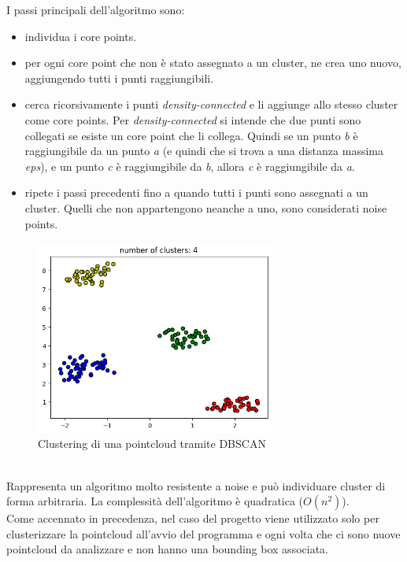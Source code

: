 \documentclass[italian]{report}
\begin{document}
I passi principali dell'algoritmo sono:
\begin{itemize}
	\item individua i core points.
	\item per ogni core point che non è stato assegnato a un cluster, ne crea uno nuovo, aggiungendo tutti i punti raggiungibili.
	\item cerca ricorsivamente i punti \textit{density-connected} e li aggiunge allo stesso cluster come core points. Per \textit{density-connected} si intende che due punti sono collegati se esiste un core point che li collega.		Quindi se un punto \textit{b} è raggiungibile da un punto \textit{a} (e quindi che si trova a una distanza massima \textit{eps}), e un punto \textit{c} è raggiungibile da \textit{b}, allora \textit{c} è raggiungibile da \textit{a}.
	\item ripete i passi precedenti fino a quando tutti i punti sono assegnati a un cluster. Quelli che non appartengono neanche a uno, sono considerati noise points.
\end{itemize}
\begin{figure}[H]
	\centering
	\includegraphics[width=0.7\textwidth]{dbscan}
	\footnotesize
	\caption{Clustering di una pointcloud tramite DBSCAN}	
\end{figure}\\
Rappresenta un algoritmo molto resistente a noise e può individuare cluster di forma arbitraria. La complessità dell'algoritmo è quadratica ($O(n^2)$)\cite{DBSCAN}.\\
Come accennato in precedenza, nel caso del progetto viene utilizzato solo per clusterizzare la pointcloud all'avvio del programma e ogni volta che ci sono nuove pointcloud da analizzare e non hanno una bounding box associata.
\end{document}
